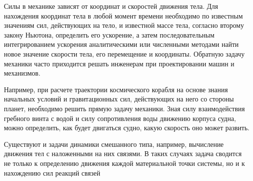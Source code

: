 Силы в механике зависят от координат и скоростей движения тела. Для нахождения координат тела в любой момент времени необходимо по известным значениям сил, действующих на тело, и известной массе тела, согласно второму закону Ньютона, определить его ускорение, а затем последовательным интегрированием ускорения аналитическими или численными методами найти новое значение скорости тела, его перемещение и координаты. Обратную задачу механики часто приходится решать инженерам при проектировании машин и механизмов.

Например, при расчете траектории космического корабля на основе знания начальных условий и гравитационных сил, действующих на него со стороны планет, необходимо решить прямую задачу механики. Зная силу взаимодействия гребного винта с водой и силу сопротивления воды движению корпуса судна, можно определить, как будет двигаться судно, какую скорость оно может развить.

Существуют и задачи динамики смешанного типа, например, вычисление движения тел с наложенными на них связями. В таких случаях задача сводится не только к определению движения каждой материальной точки системы, но и к нахождению сил реакций связей

